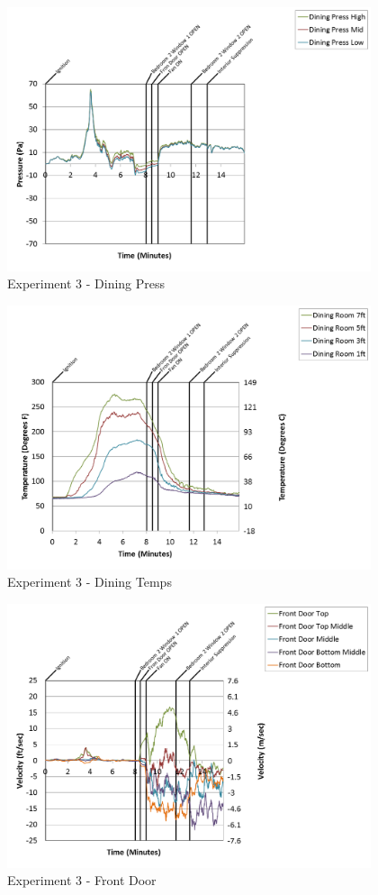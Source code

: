\documentclass{article}
\begin{document}
\begin{appendices}
\begin{figure}[h!]
	\centering
	\includegraphics[height=3.05in]{0_Images/Results_Charts/Exp_3_Charts/DiningPress.png}
	\caption{Experiment 3 - Dining Press}
\end{figure}

\clearpage

\begin{figure}[h!]
	\centering
	\includegraphics[height=3.05in]{0_Images/Results_Charts/Exp_3_Charts/DiningTemps.png}
	\caption{Experiment 3 - Dining Temps}
\end{figure}


\begin{figure}[h!]
	\centering
	\includegraphics[height=3.05in]{0_Images/Results_Charts/Exp_3_Charts/FrontDoor.png}
	\caption{Experiment 3 - Front Door}
\end{figure}


\end{appendices}
\end{document}
